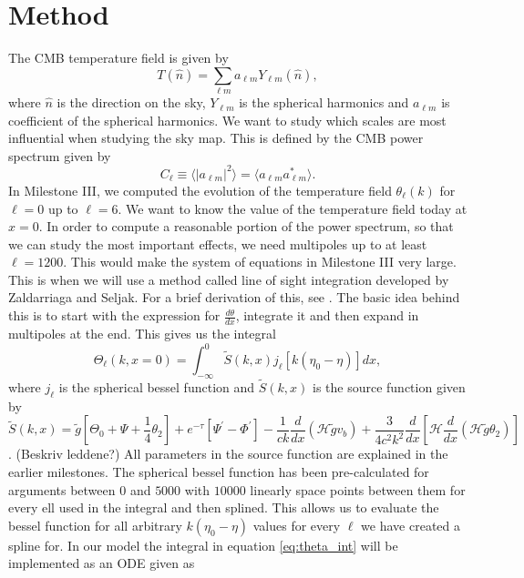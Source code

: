 \documentclass[onecolumn]{aastex62}
\begin{document}
\section{Method} \label{sec:method}
The CMB temperature field is given by
\begin{equation}
    T(\hat{n}) = \sum_{\ell m} a_{\ell m} Y_{\ell m}(\hat{n}),
\end{equation}
where $\hat{n}$ is the direction on the sky, $Y_{\ell m}$ is the spherical harmonics and $a_{\ell m}$ is coefficient of the spherical harmonics. We want to study which scales are most influential when studying the sky map. This is defined by the CMB power spectrum given by 
\begin{equation}
    C_\ell \equiv \langle |a_{\ell m}|^2 \rangle = \langle a_{\ell m}a_{\ell m}^* \rangle.
\end{equation}
In Milestone III, we computed the evolution of the temperature field $\theta_\ell(k)$ for $\ell=0$ up to $\ell=6$. We want to know the value of the temperature field today at $x=0$. In order to compute a reasonable portion of the power spectrum, so that we can study the most important effects, we need multipoles up to at least $\ell=1200$. This would make the system of equations in Milestone III very large. This is when we will use a method called line of sight integration developed by Zaldarriaga and Seljak. For a brief derivation of this, see \cite{callin2006calculate:2006}. The basic idea behind this is to 
start with the expression for $\frac{d\theta}{dx}$, integrate it and then expand in multipoles at the end. This gives us the integral
\begin{equation}\label{eq:theta_int}
    \Theta_\ell(k, x=0) = \int_{-\infty}^{0} \tilde{S}(k,x)
              j_\ell[k(\eta_0-\eta)] dx,
\end{equation}
where $j_\ell$ is the spherical bessel function and $\tilde{S}(k,x)$ is the source function given by
\begin{equation}
    \tilde{S}(k,x) = \tilde{g}\left[ \Theta_0 + \Psi + \frac{1}{4}\theta_2\right] +
              e^{-\tau} \left[\Psi^\prime-\Phi^\prime\right] -
              \frac{1}{ck}\frac{d}{dx}(\mathcal{H}\tilde{g}v_b) + \frac{3}{4c^2k^2} \frac{d}{dx}
              \left[\mathcal{H}\frac{d}{dx} (\mathcal{H}\tilde{g}\theta_2)\right]
\end{equation}
\cite{WintherIV:2020}. (Beskriv leddene?) All parameters in the source function are explained in the earlier milestones. The spherical bessel function has been pre-calculated for arguments between $0$ and $5000$ with $10000$ linearly space points between them for every ell used in the integral and then splined. This allows us to evaluate the bessel function for all arbitrary $k(\eta_0-\eta)$ values for every $\ell$ we have created a spline for. In our model the integral in equation \ref{eq:theta_int} will be implemented as an ODE given as
\end{document}
